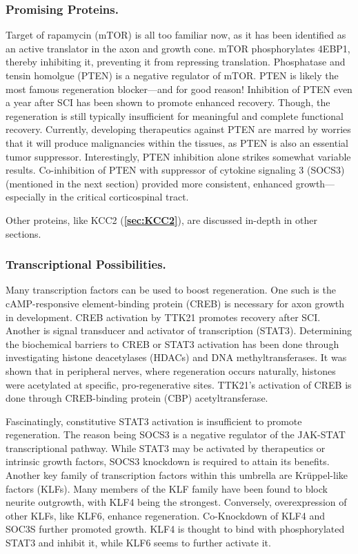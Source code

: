 \subsubsection{Promising Proteins.}

Target of rapamycin (mTOR) is all too familiar now, as it has been identified as an active translator in the axon and growth cone. mTOR phosphorylates 4EBP1, thereby inhibiting it, preventing it from repressing translation. Phosphatase and tensin homolgue (PTEN) is a negative regulator of mTOR. PTEN is likely the most famous regeneration blocker---and for good reason! Inhibition of PTEN even a year after SCI has been shown to promote enhanced recovery. Though, the regeneration is still typically insufficient for meaningful and complete functional recovery. Currently, developing therapeutics against PTEN are marred by worries that it will produce malignancies within the tissues, as PTEN is also an essential tumor suppressor. Interestingly, PTEN inhibition alone strikes somewhat variable results. Co-inhibition of PTEN with suppressor of cytokine signaling 3 (SOCS3) (mentioned in the next section) provided more consistent, enhanced growth---especially in the critical corticospinal tract.\newline 

Other proteins, like KCC2 (\textbf{\ref{sec:KCC2}}), are discussed in-depth in other sections. 

\subsubsection{Transcriptional Possibilities.}

Many transcription factors can be used to boost regeneration. One such is the cAMP-responsive element-binding protein (CREB) is necessary for axon growth in development. CREB activation by TTK21 promotes recovery after SCI. Another is signal transducer and activator of transcription (STAT3). Determining the biochemical barriers to CREB or STAT3 activation has been done through investigating histone deacetylases (HDACs) and DNA methyltransferases. It was shown that in peripheral nerves, where regeneration occurs naturally, histones were acetylated at specific, pro-regenerative sites. TTK21's activation of CREB is done through CREB-binding protein (CBP) acetyltransferase.\newline

Fascinatingly, constitutive STAT3 activation is insufficient to promote regeneration. The reason being SOCS3 is a negative regulator of the JAK-STAT transcriptional pathway. While STAT3 may be activated by therapeutics or intrinsic growth factors, SOCS3 knockdown is required to attain its benefits. Another key family of transcription factors within this umbrella are Kr\"{u}ppel-like factors (KLFs). Many members of the KLF family have been found to block neurite outgrowth, with KLF4 being the strongest. Conversely, overexpression of other KLFs, like KLF6, enhance regeneration. Co-Knockdown of KLF4 and SOC3S further promoted growth. KLF4 is thought to bind with phosphorylated STAT3 and inhibit it, while KLF6 seems to further activate it.\newline

